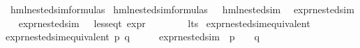 \begin{isabellebody}
\isanewline
{}\isamarkupfalse%
\ hml{\isacharunderscore}{\kern0pt}{}{\isacharunderscore}{\kern0pt}nested{\isacharunderscore}{\kern0pt}sim{\isacharunderscore}{\kern0pt}formulas\ \isanewline
{\isachardoublequoteopen}hml{\isacharunderscore}{\kern0pt}{}{\isacharunderscore}{\kern0pt}nested{\isacharunderscore}{\kern0pt}sim{\isacharunderscore}{\kern0pt}formulas\ {\isasymequiv}\ {\isacharbraceleft}{\kern0pt}{\isasymphi}{\isachardot}{\kern0pt}\ hml{\isacharunderscore}{\kern0pt}{}{\isacharunderscore}{\kern0pt}nested{\isacharunderscore}{\kern0pt}sim\ {\isasymphi}{\isacharbraceright}{\kern0pt}{\isachardoublequoteclose}\isanewline
\isanewline
{}\isamarkupfalse%
\ expr{\isacharunderscore}{\kern0pt}{}{\isacharunderscore}{\kern0pt}nested{\isacharunderscore}{\kern0pt}sim\isanewline
\ \ \isanewline
{\isachardoublequoteopen}expr{\isacharunderscore}{\kern0pt}{}{\isacharunderscore}{\kern0pt}nested{\isacharunderscore}{\kern0pt}sim\ {\isacharequal}{\kern0pt}\ {\isacharbraceleft}{\kern0pt}{\isasymphi}{\isachardot}{\kern0pt}\ {\isacharparenleft}{\kern0pt}less{\isacharunderscore}{\kern0pt}eq{\isacharunderscore}{\kern0pt}t\ {\isacharparenleft}{\kern0pt}expr\ {\isasymphi}{\isacharparenright}{\kern0pt}\ {\isacharparenleft}{\kern0pt}{\isasyminfinity}{\isacharcomma}{\kern0pt}\ {\isasyminfinity}{\isacharcomma}{\kern0pt}\ {\isasyminfinity}{\isacharcomma}{\kern0pt}\ {\isasyminfinity}{\isacharcomma}{\kern0pt}\ {\isasyminfinity}{\isacharcomma}{\kern0pt}\ {}{\isacharparenright}{\kern0pt}{\isacharparenright}{\kern0pt}{\isacharbraceright}{\kern0pt}{\isachardoublequoteclose}\isanewline
\isanewline
{}\isamarkupfalse%
\ lts\isanewline
{}\isanewline
\isanewline
{}\isamarkupfalse%
\ expr{\isacharunderscore}{\kern0pt}{}{\isacharunderscore}{\kern0pt}nested{\isacharunderscore}{\kern0pt}sim{\isacharunderscore}{\kern0pt}equivalent\isanewline
\ \ \isanewline
{\isachardoublequoteopen}expr{\isacharunderscore}{\kern0pt}{}{\isacharunderscore}{\kern0pt}nested{\isacharunderscore}{\kern0pt}sim{\isacharunderscore}{\kern0pt}equivalent\ p\ q\ {\isasymequiv}\ {\isacharparenleft}{\kern0pt}{\isasymforall}\ {\isasymphi}{\isachardot}{\kern0pt}\ {\isasymphi}\ {\isasymin}\ expr{\isacharunderscore}{\kern0pt}{}{\isacharunderscore}{\kern0pt}nested{\isacharunderscore}{\kern0pt}sim\ {\isasymlongrightarrow}\ {\isacharparenleft}{\kern0pt}p\ {\isasymTurnstile}\ {\isasymphi}{\isacharparenright}{\kern0pt}\ {\isasymlongleftrightarrow}\ {\isacharparenleft}{\kern0pt}q\ {\isasymTurnstile}\ {\isasymphi}{\isacharparenright}{\kern0pt}{\isacharparenright}{\kern0pt}{\isachardoublequoteclose}\isanewline

\end{isabellebody}
